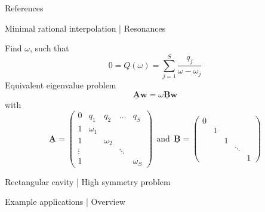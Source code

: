 \documentclass{beamer}
\begin{document}
\begin{frame}{References}
    
\end{frame}


\begin{frame}{Minimal rational interpolation | Resonances}

    Find $\omega$, such that
    \begin{equation*}
        0 = Q(\omega) = \sum_{j=1}^S \frac{q_j}{\omega - \omega_j}
    \end{equation*}
    Equivalent eigenvalue problem%
    \begin{equation*}
        \mathbf{\underline{A}} \mathbf{w} = \omega \mathbf{\underline{B}} \mathbf{w}
    \end{equation*}
    with
    \begin{equation*}
        \mathbf{\underline{A}} = \begin{pmatrix}
            0 & q_1 & q_2 & \dots & q_S \\
            1 & \omega_1 & & & \\
            1 & & \omega_2 & & \\
            \vdots & & & \ddots & \\
            1 & & & & \omega_S
        \end{pmatrix} ~~\text{and}~~
        \mathbf{\underline{B}} = \begin{pmatrix}
            0 & & & & \\
            & 1 & & & \\
            & & 1 & & \\ 
            & & & \ddots & \\ 
            & & & & 1
        \end{pmatrix}
    \end{equation*}

\end{frame}

\begin{frame}{Rectangular cavity | High symmetry problem}
    \begin{figure}
        \centering
        \scalebox{0.8}{}
    \end{figure}
\end{frame}

\begin{frame}{Example applications | Overview}
    \begin{figure}
        \centering
        \scalebox{0.8}{}
    \end{figure}
\end{frame}
\end{document}
